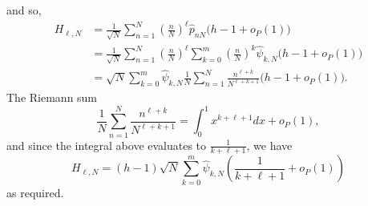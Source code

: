 \documentclass[journal]{IEEEtran}
\begin{document}
\begin{IEEEproof}
and so,
\begin{align*}
H_{\ell,N} &= \frac{1}{\sqrt{N}}\sum_{n=1}^{N}(\tfrac{n}{N})^\ell \widehat{p}_{nN}\big( h - 1 + o_P(1) \big)  \\
&=  \frac{1}{\sqrt{N}} \sum_{n=1}^{N}(\tfrac{n}{N})^\ell \sum_{k=0}^m (\tfrac{n}{N})^k \widehat{\psi}_{k,N} \big( h - 1 + o_P(1) \big)   \\
&= \sqrt{N}\sum_{k=0}^m \widehat{\psi}_{k,N} \frac{1}{N} \sum_{n=1}^{N} \frac{n^{\ell + k}}{N^{\ell + k + 1}}\big( h - 1 + o_P(1)  \big).
\end{align*}
The Riemann sum
\[
\frac{1}{N} \sum_{n=1}^{N} \frac{n^{\ell + k}}{N^{\ell + k + 1}} = \int_{0}^{1}x^{k+\ell+1}dx + o_P(1),
\]
and since the integral above evaluates to $\frac{1}{k+\ell+1}$, we have
\[
H_{\ell,N} = (h - 1)\sqrt{N}\sum_{k=0}^m \widehat{\psi}_{k,N}\left( \frac{1}{k+\ell+1} + o_P(1)  \right)
\]
as required.
\end{IEEEproof}
\end{document}
